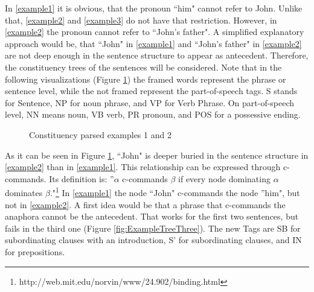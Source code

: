 In \ref{example1} it is obvious, that the pronoun ``him" cannot refer to John. Unlike that, \ref{example2} and \ref{example3} do not have that restriction. However, in \ref{example2} the pronoun cannot refer to ``John's father". A simplified explanatory approach would be, that ``John" in \ref{example1} and ``John's father" in \ref{example2} are not deep enough in the sentence structure to appear as antecedent. Therefore, the constituency trees of the sentences will be considered. Note that in the following visualizations (Figure \ref{fig:twoTreeExample}) the framed words represent the phrase or sentence level, while the not framed represent the part-of-speech tags. S stands for Sentence, NP for noun phrase, and VP for Verb Phrase. On part-of-speech level, NN means noun, VB verb, PR pronoun, and POS for a possessive ending. 

\begin{figure}[h]
    \centering\sffamily
{}
    \caption{Constituency parsed examples 1 and 2}%
    \label{fig:twoTreeExample}%
\end{figure}

As it can be seen in Figure \ref{fig:twoTreeExample}, ``John" is deeper buried in the sentence structure in \ref{example2} than in \ref{example1}. This relationship can be expressed through c-commands. Its definition is: ''$\alpha$ c-commands $\beta$ if every node dominating $\alpha$ dominates $\beta$."\footnote{http://web.mit.edu/norvin/www/24.902/binding.html} In \ref{example1} the node ``John" c-commands the node ''him", but not in \ref{example2}. A first idea would be that a phrase that c-commands the anaphora cannot be the antecedent. That works for the first two sentences, but fails in the third one (Figure \ref{fig:ExampleTreeThree}). The new Tags are SB for subordinating clauses with an introduction, S' for subordinating clauses, and IN for prepositions.


